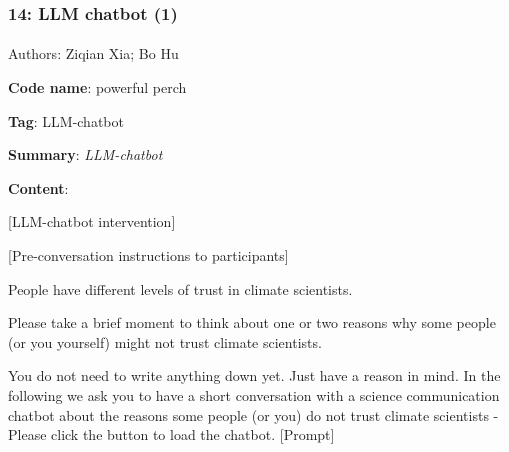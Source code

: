 \documentclass[
  letterpaper,
  DIV=11,
  numbers=noendperiod]{scrartcl}
\makeatletter
\let\oldparagraph\paragraph
\renewcommand{\paragraph}{
    \@ifstar
      \xxxParagraphStar
      \xxxParagraphNoStar
  }
\newcommand{\xxxParagraphStar}[1]{\oldparagraph*{#1}\mbox{}}
\newcommand{\xxxParagraphNoStar}[1]{\oldparagraph{#1}\mbox{}}
\makeatother
\begin{document}
\subsubsection{14: LLM chatbot (1)}\label{llm-chatbot-1}

\paragraph{Authors: Ziqian Xia; Bo Hu}\label{authors-ziqian-xia-bo-hu}

\textbf{Code name}: powerful perch

\textbf{Tag}: LLM-chatbot

\textbf{Summary}: \emph{LLM-chatbot}

\textbf{Content}:

{[}LLM-chatbot intervention{]}

{[}Pre-conversation instructions to participants{]}

People have different levels of trust in climate scientists.

Please take a brief moment to think about one or two reasons why some
people (or you yourself) might not trust climate scientists.

You do not need to write anything down yet. Just have a reason in mind.
In the following we ask you to have a short conversation with a science
communication chatbot about the reasons some people (or you) do not
trust climate scientists - Please click the button to load the chatbot.
{[}Prompt{]}
\end{document}
